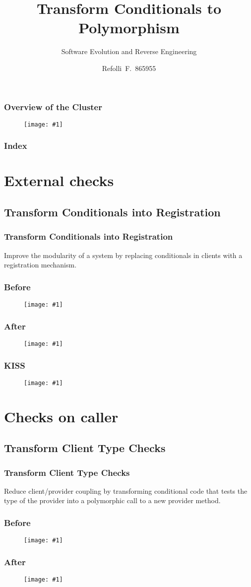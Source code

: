 \documentclass{beamer}
\title{Transform Conditionals to Polymorphism}
\subtitle{Software Evolution and Reverse Engineering}
\author{Refolli~F.~865955}
\newcommand{\putimage}[2] {
  \begin{figure}[H]
    \centering
    \texttt{[image: \#1]}
	\end{figure}
}
\begin{document}
\frame{\titlepage}

\begin{frame}
\frametitle{Overview of the Cluster}
  \putimage{images/cluster.png}{1}
\end{frame}

\begin{frame}
\frametitle{Index}
\tableofcontents
\end{frame}

\section{External checks}

\subsection{Transform Conditionals into Registration}
\begin{frame}
\frametitle{Transform Conditionals into Registration}
\huge Improve the modularity of a system by replacing conditionals in clients with a registration mechanism.
\end{frame}
\begin{frame}
\frametitle{Before}
  \putimage{images/transform-conditionals-into-registration/before.png}{0.80}
\end{frame}
\begin{frame}
\frametitle{After}
  \putimage{images/transform-conditionals-into-registration/after.png}{0.70}
\end{frame}
\begin{frame}
\frametitle{KISS}
  \putimage{images/transform-conditionals-into-registration/simple.png}{0.60}
\end{frame}

\section{Checks on caller}

\subsection{Transform Client Type Checks}
\begin{frame}
\frametitle{Transform Client Type Checks}
\huge Reduce client/provider coupling by transforming conditional code that tests the type of the provider into a polymorphic call to a new provider method. 
\end{frame}
\begin{frame}
\frametitle{Before}
  \putimage{images/transform-client-type-checks/before.png}{0.99}
\end{frame}
\begin{frame}
\frametitle{After}
  \putimage{images/transform-client-type-checks/after.png}{0.99}
\end{frame}
\end{document}
